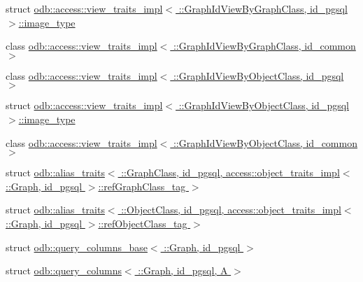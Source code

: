 \begin{DoxyCompactItemize}
\item 
struct \hyperlink{structodb_1_1access_1_1view__traits__impl_3_01_1_1_graph_id_view_by_graph_class_00_01id__pgsql_01_4_1_1image__type}{odb\+::access\+::view\+\_\+traits\+\_\+impl$<$ \+::\+Graph\+Id\+View\+By\+Graph\+Class, id\+\_\+pgsql $>$\+::image\+\_\+type}
\item 
class \hyperlink{classodb_1_1access_1_1view__traits__impl_3_01_1_1_graph_id_view_by_graph_class_00_01id__common_01_4}{odb\+::access\+::view\+\_\+traits\+\_\+impl$<$ \+::\+Graph\+Id\+View\+By\+Graph\+Class, id\+\_\+common $>$}
\item 
class \hyperlink{classodb_1_1access_1_1view__traits__impl_3_01_1_1_graph_id_view_by_object_class_00_01id__pgsql_01_4}{odb\+::access\+::view\+\_\+traits\+\_\+impl$<$ \+::\+Graph\+Id\+View\+By\+Object\+Class, id\+\_\+pgsql $>$}
\item 
struct \hyperlink{structodb_1_1access_1_1view__traits__impl_3_01_1_1_graph_id_view_by_object_class_00_01id__pgsql_01_4_1_1image__type}{odb\+::access\+::view\+\_\+traits\+\_\+impl$<$ \+::\+Graph\+Id\+View\+By\+Object\+Class, id\+\_\+pgsql $>$\+::image\+\_\+type}
\item 
class \hyperlink{classodb_1_1access_1_1view__traits__impl_3_01_1_1_graph_id_view_by_object_class_00_01id__common_01_4}{odb\+::access\+::view\+\_\+traits\+\_\+impl$<$ \+::\+Graph\+Id\+View\+By\+Object\+Class, id\+\_\+common $>$}
\item 
struct \hyperlink{structodb_1_1alias__traits_3_01_1_1_graph_class_00_01id__pgsql_00_01access_1_1object__traits__im1cc89598874d63c16da0df475d829efe}{odb\+::alias\+\_\+traits$<$ \+::\+Graph\+Class, id\+\_\+pgsql, access\+::object\+\_\+traits\+\_\+impl$<$ \+::\+Graph, id\+\_\+pgsql $>$\+::ref\+Graph\+Class\+\_\+tag $>$}
\item 
struct \hyperlink{structodb_1_1alias__traits_3_01_1_1_object_class_00_01id__pgsql_00_01access_1_1object__traits__i1ebaecaa53ca957735d3ecda1964730f}{odb\+::alias\+\_\+traits$<$ \+::\+Object\+Class, id\+\_\+pgsql, access\+::object\+\_\+traits\+\_\+impl$<$ \+::\+Graph, id\+\_\+pgsql $>$\+::ref\+Object\+Class\+\_\+tag $>$}
\item 
struct \hyperlink{structodb_1_1query__columns__base_3_01_1_1_graph_00_01id__pgsql_01_4}{odb\+::query\+\_\+columns\+\_\+base$<$ \+::\+Graph, id\+\_\+pgsql $>$}
\item 
struct \hyperlink{structodb_1_1query__columns_3_01_1_1_graph_00_01id__pgsql_00_01_a_01_4}{odb\+::query\+\_\+columns$<$ \+::\+Graph, id\+\_\+pgsql, A $>$}
\item 

\end{DoxyCompactItemize}
